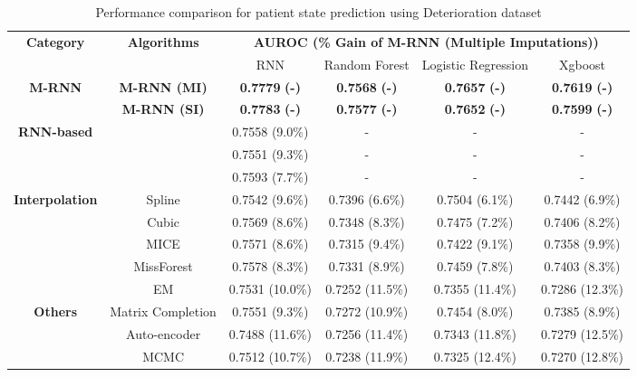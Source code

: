 \documentclass{article}
\begin{document}
\begin{table*}[h!]
	\caption{Performance comparison for patient state prediction using Deterioration dataset}
	\label{tab:AddPrediction}
	\centering
	\small
	\begin{tabular}{c|c|c|c|c|c}
		\toprule
		\multirow{2}{*}{\textbf{Category}} & \multirow{2}{*}{\textbf{Algorithms}} &\multicolumn{4}{c}{\textbf{AUROC (\% Gain of M-RNN (Multiple Imputations))}}  \\
		\cmidrule{3-6}
		& & RNN & Random Forest & Logistic Regression & Xgboost \\
		\midrule
		\multirow{2}{*}{\textbf{M-RNN}}&\textbf{M-RNN (MI)} &  \textbf{0.7779}  \textbf{(-)}  &\textbf{0.7568}  \textbf{(-)} &\textbf{0.7657}  \textbf{(-)}&\textbf{0.7619}  \textbf{(-)} \\
		&\textbf{M-RNN (SI)} &  \textbf{0.7783}  \textbf{(-)}  & \textbf{0.7577}  \textbf{(-)} &\textbf{0.7652}  \textbf{(-)}&\textbf{0.7599}  \textbf{(-)} \\
		\midrule
		\multirow{3}{*}{\textbf{RNN-based}} &\cite{Recent_RNN1} &  0.7558  (9.0\%)  &-  &- &-\\
		&\cite{Recent_RNN2}   & 0.7551  (9.3\%)&-  &- &-\\
		&\cite{Recent_RNN3}   &0.7593  (7.7\%)&-  &- &-\\
		\midrule
		\multirow{3}{*}{\textbf{Interpolation}}&Spline    &  0.7542 (9.6\%)& 0.7396  (6.6\%)&0.7504 (6.1\%)&0.7442 (6.9\%) \\
		& Cubic   & 0.7569 (8.6\%)&0.7348 (8.3\%)&0.7475 (7.2\%)&0.7406  (8.2\%)\\
		\midrule
		\multirow{3}{*}{\textbf{Imputation}}& MICE & 0.7571 (8.6\%)  &0.7315 (9.4\%)&0.7422 (9.1\%) &0.7358 (9.9\%) \\
		& MissForest & 0.7578 (8.3\%)  & 0.7331 (8.9\%) &0.7459 (7.8\%)& 0.7403 (8.3\%)\\		
		& EM    &  0.7531 (10.0\%)&0.7252 (11.5\%)& 0.7355 (11.4\%)& 0.7286 (12.3\%) \\ \hline
		\multirow{3}{*}{\textbf{Others}}& Matrix Completion   &  0.7551 (9.3\%)&0.7272 (10.9\%)&0.7454 (8.0\%)& 0.7385 (8.9\%) \\
		&Auto-encoder   & 0.7488 (11.6\%) &0.7256 (11.4\%)&0.7343 (11.8\%) &0.7279 (12.5\%)  \\
		&MCMC   & 0.7512 (10.7\%) &0.7238 (11.9\%)&0.7325 (12.4\%) &0.7270 (12.8\%)  \\
		\bottomrule
	\end{tabular}
\end{table*}
\end{document}
